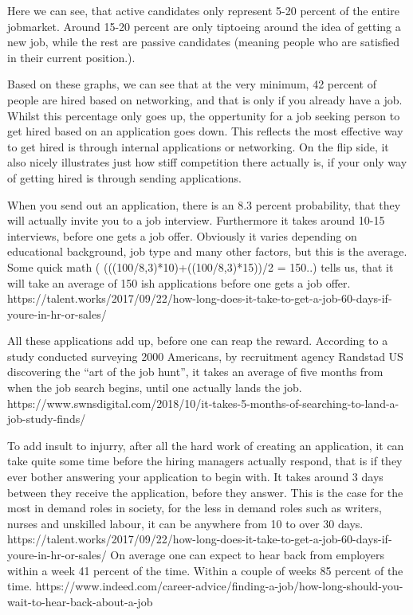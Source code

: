 Here we can see, that active candidates only represent 5-20 percent of the
entire jobmarket. Around 15-20 percent are only tiptoeing around the idea
of getting a new job, while the rest are passive candidates (meaning people who are
satisfied in their current position.).

Based on these graphs, we can see that at the very minimum, 42 percent of people are
hired based on networking, and that is only if you already have a job.
Whilst this percentage only goes up, the oppertunity for a job seeking person
to get hired based on an application goes down. This reflects the
most effective way to get hired is through internal applications or networking.
On the flip side, it also nicely illustrates just how stiff competition there actually is,
if your only way of getting hired is through sending applications.

When you send out an application, there is an 8.3 percent probability, that
they will actually invite you to a job interview. Furthermore it takes around
10-15 interviews, before one gets a job offer. Obviously it varies depending
on educational background, job type and many other factors, but this is the average.
Some quick math ( (((100/8,3)*10)+((100/8,3)*15))/2 = 150..) tells us, that it will
take an average of 150 ish applications before one gets a job offer.
https://talent.works/2017/09/22/how-long-does-it-take-to-get-a-job-60-days-if-youre-in-hr-or-sales/

All these applications add up, before one can reap the reward. According to a
study conducted surveying 2000 Americans, by recruitment agency Randstad US
discovering the “art of the job hunt”, it takes an average of five
months from when the job search begins, until one actually lands
the job.
https://www.swnsdigital.com/2018/10/it-takes-5-months-of-searching-to-land-a-job-study-finds/

To add insult to injurry, after all the hard work of creating an application, it can
take quite some time before the hiring managers actually respond, that is if they ever
bother answering your application to begin with.
It takes around 3 days between they receive the application, before they answer.
This is the case for the most in demand roles in society, for the less in demand roles
such as writers, nurses and unskilled labour, it can be anywhere from 10 to over 30 days.
https://talent.works/2017/09/22/how-long-does-it-take-to-get-a-job-60-days-if-youre-in-hr-or-sales/
On average one can expect to hear back from employers within a week 41 percent
of the time. Within a couple of weeks 85 percent of the time.
https://www.indeed.com/career-advice/finding-a-job/how-long-should-you-wait-to-hear-back-about-a-job

